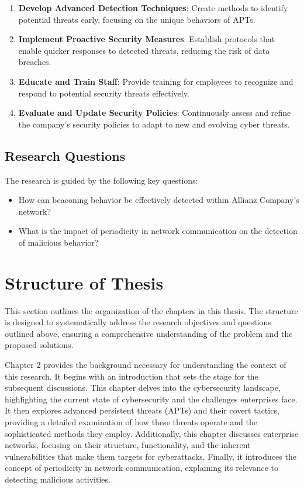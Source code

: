\begin{enumerate}
    \item \textbf{Develop Advanced Detection Techniques}: Create methods to identify potential threats early, focusing on the unique behaviors of APTs.
    \item \textbf{Implement Proactive Security Measures}: Establish protocols that enable quicker responses to detected threats, reducing the risk of data breaches.
    \item \textbf{Educate and Train Staff}: Provide training for employees to recognize and respond to potential security threats effectively.
    \item \textbf{Evaluate and Update Security Policies}: Continuously assess and refine the company’s security policies to adapt to new and evolving cyber threats.
\end{enumerate}


\subsection{Research Questions}
The research is guided by the following key questions:
\begin{itemize}
    \item How can beaconing behavior be effectively detected within Allianz Company’s network?
    \item What is the impact of periodicity in network communication on the detection of malicious behavior?
\end{itemize}

\section{Structure of Thesis}
This section outlines the organization of the chapters in this thesis. The structure is designed to systematically address the research objectives and questions outlined above, ensuring a comprehensive understanding of the problem and the proposed solutions.

Chapter 2 provides the  background necessary for understanding the context of this research. It begins with an introduction that sets the stage for the subsequent discussions. This chapter delves into the cybersecurity landscape, highlighting the current state of cybersecurity and the challenges enterprises face. It then explores advanced persistent threats (APTs) and their covert tactics, providing a detailed examination of how these threats operate and the sophisticated methods they employ. Additionally, this chapter discusses enterprise networks, focusing on their structure, functionality, and the inherent vulnerabilities that make them targets for cyberattacks. Finally, it introduces the concept of periodicity in network communication, explaining its relevance to detecting malicious activities.

